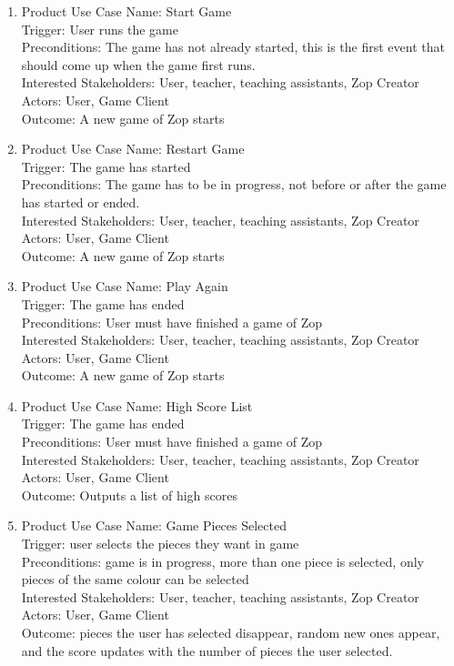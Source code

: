 \documentclass[12pt]{article}
\begin{document}
\begin{enumerate}
 \item Product Use Case Name: Start Game\\
 Trigger: User runs the game\\
 Preconditions: The game has not already started, this is the first event that should come up when the game first runs. \\
 Interested Stakeholders: User, teacher, teaching assistants, Zop Creator\\
 Actors: User, Game Client\\
 Outcome: A new game of Zop starts\\
 
 \item Product Use Case Name: Restart Game\\
 Trigger: The game has started\\
 Preconditions: The game has to be in progress, not before or after the game has started or ended. \\
 Interested Stakeholders: User, teacher, teaching assistants, Zop Creator\\
 Actors: User, Game Client\\
 Outcome: A new game of Zop starts\\
 
 \item Product Use Case Name: Play Again\\
 Trigger: The game has ended\\
 Preconditions: User must have finished a game of Zop\\
 Interested Stakeholders: User, teacher, teaching assistants, Zop Creator\\
 Actors: User, Game Client\\
 Outcome: A new game of Zop starts\\
 
 \item Product Use Case Name: High Score List\\
 Trigger: The game has ended\\
 Preconditions: User must have finished a game of Zop\\
 Interested Stakeholders: User, teacher, teaching assistants, Zop Creator\\
 Actors: User, Game Client\\
 Outcome: Outputs a list of high scores\\
 
 \item Product Use Case Name: Game Pieces Selected\\
 Trigger: user selects the pieces they want in game\\
 Preconditions: game is in progress, more than one piece is selected, only pieces of the same colour can be selected\\
 Interested Stakeholders: User, teacher, teaching assistants, Zop Creator\\
 Actors: User, Game Client\\
 Outcome: pieces the user has selected disappear, random new ones appear, and the score updates with the number of pieces the user selected.\\
 

\end{enumerate}
\end{document}
